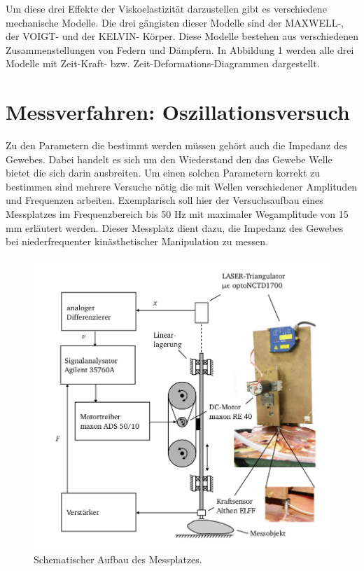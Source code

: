 \documentclass[11pt]{article}
\begin{document}
		Um diese drei Effekte der Viskoelastizität darzustellen gibt es verschiedene mechanische 
		Modelle. Die drei gängisten dieser Modelle sind der MAXWELL-, der VOIGT- und der KELVIN-
		Körper. Diese Modelle bestehen aus verschiedenen Zusammenstellungen von Federn und Dämpfern.
		In Abbildung 1 werden alle drei Modelle mit Zeit-Kraft- bzw. Zeit-Deformations-Diagrammen 
		dargestellt. 
		
		

		 

	\section{Messverfahren: Oszillationsversuch}
		 Zu den Parametern die bestimmt werden müssen gehört auch die Impedanz des Gewebes.
		 Dabei handelt es sich um den Wiederstand den das Gewebe Welle bietet die sich darin 
		 ausbreiten. Um einen solchen Parametern korrekt zu bestimmen sind mehrere Versuche nötig 
		 die mit Wellen verschiedener Amplituden und Frequenzen arbeiten. Exemplarisch soll
		 hier der Versuchsaufbau eines Messplatzes im Frequenzbereich bis 50 Hz mit maximaler 
		 Wegamplitude von 15 mm erläutert werden. Dieser Messplatz dient dazu, die Impedanz des 
		 Gewebes bei niederfrequenter kinästhetischer Manipulation zu messen.
		  
		 \begin{figure}
		  \centering
			\includegraphics[width=\textwidth]{mess2.png}
			\caption{Schematischer Aufbau des Messplatzes.}
		\end{figure} 
		
\end{document}
